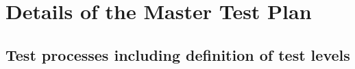 \chapter{Details of the Master Test Plan} \label{chp:details-of-the-master-test-plan}
	\begin{comment}
		$<$Introduce the following subordinate sections. This section describes the test processes, test documentation requirements, and test reporting requirements for the entire test effort. $>$
	\end{comment}
	
\section{Test processes including definition of test levels} \label{s:details-of-the-master-test-plan:test-processes-including-definition-of-test-levels}
	\begin{comment}
		$<$ Identify test activities and tasks to be performed for each of the test processes described in Clause 5 of this standard (or the alternative test processes defined by the user of this standard), and document those test activities and tasks. Provide an overview of the test activities and tasks for all development life cycle processes. Identify the number and sequence of levels of test. There may be a different number of levels than the example used in this standard (component, component integration, system, and acceptance). Integration is often accomplished through a series of test levels, for both component integration and systems integration. Examples of possible additional test levels include security, usability, performance, stress, recovery, and regression. Small systems may have fewer levels of test, e.g., combining system and acceptance. If the test processes are already defined by an organization’s standards, a reference to those standards could be substituted for the contents of this subclause.$>$
	\end{comment}
	

